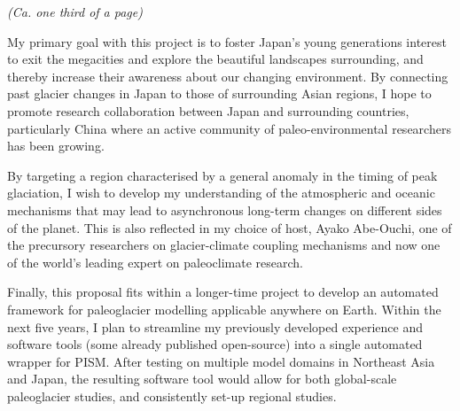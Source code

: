 \documentclass{article}
\begin{document}
    \emph{(Ca. one third of a page)}

    My primary goal with this project is to foster Japan's young generations
    interest to exit the megacities and explore the beautiful landscapes
    surrounding, and thereby increase their awareness about our changing
    environment. By connecting past glacier changes in Japan to those of
    surrounding Asian regions, I hope to promote research collaboration between
    Japan and surrounding countries, particularly China where an active
    community of paleo-environmental researchers has been growing.

    By targeting a region characterised by a general anomaly in the timing of
    peak glaciation, I wish to develop my understanding of the atmospheric and
    oceanic mechanisms that may lead to asynchronous long-term changes on
    different sides of the planet. This is also reflected in my choice of host,
    Ayako Abe-Ouchi, one of the precursory researchers on glacier-climate
    coupling mechanisms and now one of the world's leading expert on
    paleoclimate research.

    Finally, this proposal fits within a longer-time project to develop an
    automated framework for paleoglacier modelling applicable anywhere on
    Earth. Within the next five years, I plan to streamline my previously
    developed experience and software tools (some already published
    open-source) into a single automated wrapper for PISM. After testing on
    multiple model domains in Northeast Asia and Japan, the resulting software
    tool would allow for both global-scale paleoglacier studies, and
    consistently set-up regional studies.


\end{document}
